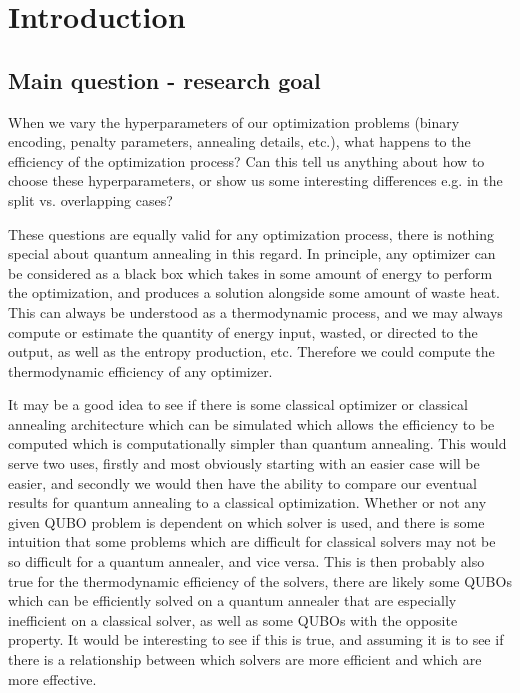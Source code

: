 \documentclass[aps,pra,amsmath,amssymb,amsfonts,lengthcheck,twocolumn,superscriptaddress]{revtex4-1}
\begin{document}
\maketitle
\section{Introduction}

\subsection{Main question - research goal}

When we vary the hyperparameters of our optimization problems (binary encoding, penalty parameters, annealing details, etc.), what happens to the efficiency of the optimization process? 
Can this tell us anything about how to choose these hyperparameters, or show us some interesting differences e.g. in the split vs. overlapping cases?

These questions are equally valid for any optimization process, there is nothing special about quantum annealing in this regard. 
In principle, any optimizer can be considered as a black box which takes in some amount of energy to perform the optimization, and produces a solution alongside some amount of waste heat.
This can always be understood as a thermodynamic process, and we may always compute or estimate the quantity of energy input, wasted, or directed to the output, as well as the entropy production, etc.
Therefore we could compute the thermodynamic efficiency of any optimizer.

It may be a good idea to see if there is some classical optimizer or classical annealing architecture which can be simulated which allows the efficiency to be computed which is computationally simpler than quantum annealing. 
This would serve two uses, firstly and most obviously starting with an easier case will be easier, and secondly we would then have the ability to compare our eventual results for quantum annealing to a classical optimization. 
Whether or not any given QUBO problem is dependent on which solver is used, and there is some intuition that some problems which are difficult for classical solvers may not be so difficult for a quantum annealer, and vice versa. 
This is then probably also true for the thermodynamic efficiency of the solvers, there are likely some QUBOs which can be efficiently solved on a quantum annealer that are especially inefficient on a classical solver, as well as some QUBOs with the opposite property.
It would be interesting to see if this is true, and assuming it is to see if there is a relationship between which solvers are more efficient and which are more effective.
\end{document}
